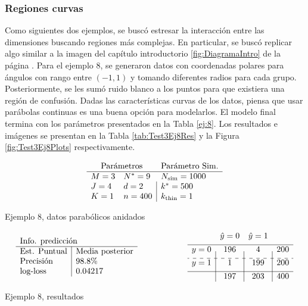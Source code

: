 \documentclass[../Main/Main.tex]{subfiles}
\begin{document}
\subsubsection{Regiones curvas}
Como siguientes dos ejemplos, se buscó estresar la interacción entre las dimensiones buscando regiones más complejas. En particular, se buscó replicar algo similar a la imagen del capítulo introductorio \ref{fig:DiagramaIntro} de la página \pageref{fig:DiagramaIntro}. Para el ejemplo 8, se generaron datos con coordenadas polares para ángulos con rango entre $(-1,1)$ y tomando diferentes radios para cada grupo. Posteriormente, se les sumó ruido blanco a los puntos para que existiera una región de confusión. Dadas las características curvas de los datos, piensa que usar parábolas continuas es una buena opción para modelarlos. El modelo final termina con los parámetros presentados en la Tabla \ref{ej:8}. Los resultados e imágenes se presentan en la Tabla \ref{tab:Test3Ej8Res} y la Figura \ref{fig:Test3Ej8Plots} respectivamente.

\begin{table}[h]
$$\paramsmod{3}{4}{1}{9}{2}{400}{1000}{500}{1}$$
\caption{Ejemplo 8, datos parabólicos anidados}
\label{ej:8}
\end{table}

\begin{table}[h]
\begin{align*}
\resultados{\text{Media posterior}}{98.8}{0.04217}
\qquad\qquad\qquad
\matconf{196}{4}{200}{1}{199}{200}{197}{203}{400}
\end{align*}
\caption{Ejemplo 8, resultados}
\label{tab:Test3Ej8Res}
\end{table}
\end{document}
